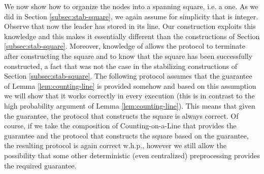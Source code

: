 \documentclass[oribibl, 11pt]{llncs}
\begin{document}
We now show how to organize the nodes into a spanning square, i.e. a  one. As we did in Section \ref{subsec:stab-square}, we again assume for simplicity that  is integer. Observe that now the leader has  stored in its line. Our construction exploits this knowledge and this makes it essentially different than the constructions of Section \ref{subsec:stab-square}. Moreover, knowledge of  allows the protocol to terminate after constructing the square and to know that the square has been successfully constructed, a fact that was not the case in the stabilizing constructions of Section \ref{subsec:stab-square}. The following protocol assumes that the guarantee of Lemma \ref{lem:counting-line} is provided somehow and based on this assumption we will show that it works correctly in every execution (this is in contrast to the high probability argument of Lemma \ref{lem:counting-line}). This means that given the guarantee, the protocol that constructs the square is always correct. Of course, if we take the composition of Counting-on-a-Line that provides the guarantee and the protocol that constructs the square based on the guarantee, the resulting protocol is again correct w.h.p., however we still allow the possibility that some other deterministic (even centralized) preprocessing provides the required guarantee.\\
\end{document}
